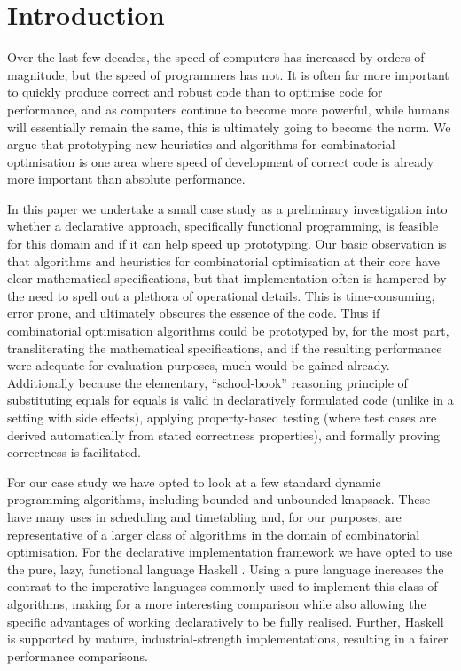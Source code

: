 \section{Introduction}

Over the last few decades, the speed of computers has increased by orders of
magnitude, but the speed of programmers has not. It is often far more
important to quickly produce correct and robust code than to optimise code for
performance, and as computers continue to become more powerful, while humans
will essentially remain the same, this is ultimately going to become the norm.
We argue that prototyping new heuristics and algorithms for combinatorial
optimisation is one area where speed of development of correct code is already
more important than absolute performance.

In this paper we undertake a small case study as a preliminary investigation
into whether a declarative approach, specifically functional programming, is
feasible for this domain and if it can help speed up prototyping. Our
basic observation is that algorithms and heuristics for combinatorial
optimisation at their core have clear mathematical specifications, but that
implementation often is hampered by the need to spell out a plethora of
operational details. This is time-consuming, error prone, and ultimately
obscures the essence of the code. Thus if combinatorial optimisation
algorithms could be prototyped by, for the most part, transliterating the
mathematical specifications, and if the resulting performance were adequate
for evaluation purposes, much would be gained already.
Additionally because the elementary, ``school-book'' reasoning principle of
substituting equals for equals is valid in declaratively formulated code
(unlike in a setting with side effects), applying property-based testing
\cite{quickcheck} (where test cases are derived automatically from stated
correctness properties), and formally proving correctness is facilitated.

For our case study we have opted to look at a few standard dynamic
programming algorithms, including bounded and unbounded knapsack. These have
many uses in scheduling and timetabling and, for our purposes, are
representative of a larger class of algorithms in the domain of combinatorial
optimisation. For the declarative implementation framework we have opted to
use the pure, lazy, functional language Haskell \cite{Haskell98Book}. Using a
pure language increases the contrast to the imperative languages commonly used
to implement this class of algorithms, making for a more interesting
comparison while also allowing the specific advantages of working
declaratively
to be fully realised. Further, Haskell is supported by mature,
industrial-strength implementations, resulting in a fairer performance
comparisons.

